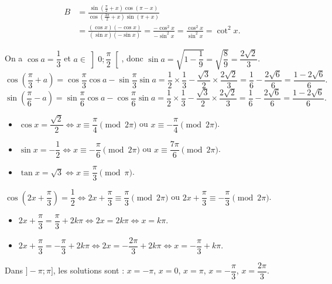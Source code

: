 \[
\begin{aligned}
B &= \frac{\sin\left(\frac{\pi}{2}+x\right)\cos(\pi-x)}{\cos\left(\frac{3\pi}{2}+x\right)\sin(\pi+x)} \\
&= \frac{(\cos x)(-\cos x)}{(\sin x)(-\sin x)} = \frac{-\cos^2 x}{-\sin^2 x} = \frac{\cos^2 x}{\sin^2 x} = \cot^2 x.
\end{aligned}
\]

On a $\cos a = \dfrac{1}{3}$ et $a \in \left]0;\dfrac{\pi}{2}\right[$, donc $\sin a = \sqrt{1-\dfrac{1}{9}} = \sqrt{\dfrac{8}{9}} = \dfrac{2\sqrt{2}}{3}$.
\[
\cos\left(\frac{\pi}{3}+a\right) = \cos\frac{\pi}{3}\cos a - \sin\frac{\pi}{3}\sin a = \frac{1}{2}\times\frac{1}{3} - \frac{\sqrt{3}}{2}\times\frac{2\sqrt{2}}{3} = \frac{1}{6} - \frac{2\sqrt{6}}{6} = \frac{1-2\sqrt{6}}{6}.
\]
\[
\sin\left(\frac{\pi}{6}-a\right) = \sin\frac{\pi}{6}\cos a - \cos\frac{\pi}{6}\sin a = \frac{1}{2}\times\frac{1}{3} - \frac{\sqrt{3}}{2}\times\frac{2\sqrt{2}}{3} = \frac{1}{6} - \frac{2\sqrt{6}}{6} = \frac{1-2\sqrt{6}}{6}.
\]

\begin{itemize}
\item $\cos x = \dfrac{\sqrt{2}}{2} \iff x \equiv \dfrac{\pi}{4} \pmod{2\pi}$ ou $x \equiv -\dfrac{\pi}{4} \pmod{2\pi}$.
\item $\sin x = -\dfrac{1}{2} \iff x \equiv -\dfrac{\pi}{6} \pmod{2\pi}$ ou $x \equiv \dfrac{7\pi}{6} \pmod{2\pi}$.
\item $\tan x = \sqrt{3} \iff x \equiv \dfrac{\pi}{3} \pmod{\pi}$.
\end{itemize}

$\cos\left(2x+\dfrac{\pi}{3}\right) = \dfrac{1}{2} \iff 2x+\dfrac{\pi}{3} \equiv \dfrac{\pi}{3} \pmod{2\pi}$ ou $2x+\dfrac{\pi}{3} \equiv -\dfrac{\pi}{3} \pmod{2\pi}$.
\begin{itemize}
\item $2x+\dfrac{\pi}{3} = \dfrac{\pi}{3} + 2k\pi \iff 2x = 2k\pi \iff x = k\pi$.
\item $2x+\dfrac{\pi}{3} = -\dfrac{\pi}{3} + 2k\pi \iff 2x = -\dfrac{2\pi}{3} + 2k\pi \iff x = -\dfrac{\pi}{3} + k\pi$.
\end{itemize}
Dans $]-\pi;\pi]$, les solutions sont : $x = -\pi$, $x = 0$, $x = \pi$, $x = -\dfrac{\pi}{3}$, $x = \dfrac{2\pi}{3}$.

